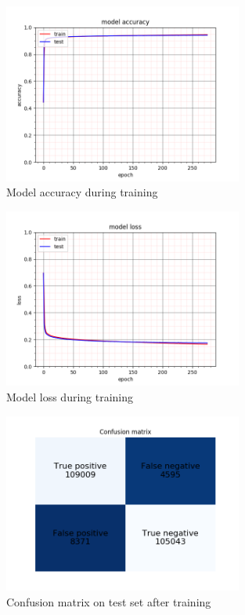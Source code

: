 \begin{figure}[H]
\center
\includegraphics[width=0.7\textwidth]{pictures/train_acc.png}
\caption{\label{fig:train_acc}Model accuracy during training}
\end{figure}

\begin{figure}[H]
\center
\includegraphics[width=0.7\textwidth]{pictures/train_loss.png}
\caption{\label{fig:train_loss}Model loss during training}
\end{figure}

\begin{figure}[H]
\center
\includegraphics[width=0.7\textwidth]{pictures/train_cm.png}
\caption{\label{fig:train_cm}Confusion matrix on test set after training}
\end{figure}

